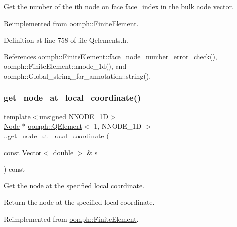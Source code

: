 Get the number of the ith node on face face\+\_\+index in the bulk node vector. 

Reimplemented from \hyperlink{classoomph_1_1FiniteElement_a2cd0ee849adf50dae1a70a20fab47119}{oomph\+::\+Finite\+Element}.



Definition at line 758 of file Qelements.\+h.



References oomph\+::\+Finite\+Element\+::face\+\_\+node\+\_\+number\+\_\+error\+\_\+check(), oomph\+::\+Finite\+Element\+::nnode\+\_\+1d(), and oomph\+::\+Global\+\_\+string\+\_\+for\+\_\+annotation\+::string().

\mbox{\label{classoomph_1_1QElement_3_011_00_01NNODE__1D_01_4_a76e18de2ca567ae669f097524b92288f}} 
\subsubsection{\texorpdfstring{get\+\_\+node\+\_\+at\+\_\+local\+\_\+coordinate()}{get\_node\_at\_local\_coordinate()}}
{\footnotesize\ttfamily template$<$unsigned N\+N\+O\+D\+E\+\_\+1D$>$ \\
\hyperlink{classoomph_1_1Node}{Node} $\ast$ \hyperlink{classoomph_1_1QElement}{oomph\+::\+Q\+Element}$<$ 1, N\+N\+O\+D\+E\+\_\+1D $>$\+::get\+\_\+node\+\_\+at\+\_\+local\+\_\+coordinate (\begin{DoxyParamCaption}\item[{const \hyperlink{classoomph_1_1Vector}{Vector}$<$ double $>$ \&}]{s }\end{DoxyParamCaption}) const\hspace{0.3cm}{\ttfamily [virtual]}}



Get the node at the specified local coordinate. 

Return the node at the specified local coordinate. 

Reimplemented from \hyperlink{classoomph_1_1FiniteElement_a2ddbb05c5f8bb35b64bec287d653105c}{oomph\+::\+Finite\+Element}.



